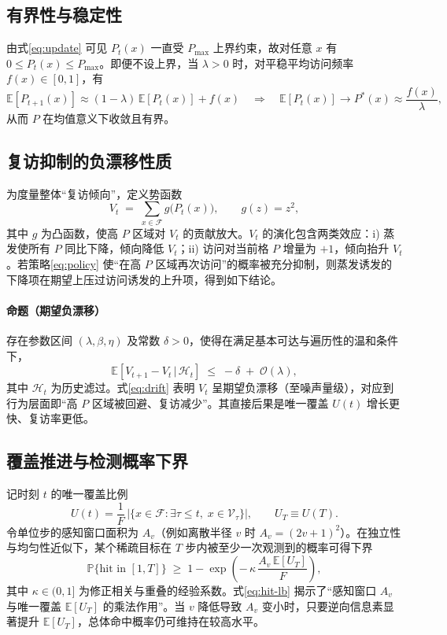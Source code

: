 \subsection{有界性与稳定性}
由式\eqref{eq:update} 可见 $P_{t}(x)$ 一直受 $P_{\max}$ 上界约束，故对任意 $x$ 有 $0\le P_t(x)\le P_{\max}$。即便不设上界，当 $\lambda>0$ 时，对平稳平均访问频率 $f(x)\in[0,1]$，有
\begin{equation}
\mathbb{E}[P_{t+1}(x)]\approx (1-\lambda)\,\mathbb{E}[P_t(x)]+f(x)
\quad\Rightarrow\quad
\mathbb{E}[P_t(x)]\to P^*(x)\approx \frac{f(x)}{\lambda},
\end{equation}
从而 $P$ 在均值意义下收敛且有界。

\subsection{复访抑制的负漂移性质}
为度量整体“复访倾向”，定义势函数
\begin{equation}
\label{eq:potential}
V_t \;=\; \sum_{x\in\mathcal{F}} g\big(P_t(x)\big),\qquad g(z)=z^2,
\end{equation}
其中 $g$ 为凸函数，使高 $P$ 区域对 $V_t$ 的贡献放大。$V_t$ 的演化包含两类效应：i) 蒸发使所有 $P$ 同比下降，倾向降低 $V_t$；ii) 访问对当前格 $P$ 增量为 $+1$，倾向抬升 $V_t$。若策略\eqref{eq:policy} 使“在高 $P$ 区域再次访问”的概率被充分抑制，则蒸发诱发的下降项在期望上压过访问诱发的上升项，得到如下结论。

\paragraph{命题（期望负漂移）}
存在参数区间 $(\lambda,\beta,\eta)$ 及常数 $\delta>0$，使得在满足基本可达与遍历性的温和条件下，
\begin{equation}
\label{eq:drift}
\mathbb{E}\!\left[V_{t+1}-V_t\,\big|\,\mathcal{H}_t\right]\;\le\; -\delta \;+\; \mathcal{O}(\lambda),
\end{equation}
其中 $\mathcal{H}_t$ 为历史滤过。式\eqref{eq:drift} 表明 $V_t$ 呈期望负漂移（至噪声量级），对应到行为层面即“高 $P$ 区域被回避、复访减少”。其直接后果是唯一覆盖 $U(t)$ 增长更快、复访率更低。

\subsection{覆盖推进与检测概率下界}
记时刻 $t$ 的唯一覆盖比例
\begin{equation}
U(t)=\frac{1}{F}\,\big|\{x\in\mathcal{F}:\exists \tau\le t,\; x\in \mathcal{V}_\tau\}\big|,
\qquad U_T\equiv U(T).
\end{equation}
令单位步的感知窗口面积为 $A_v$（例如离散半径 $v$ 时 $A_v=(2v+1)^2$）。在独立性与均匀性近似下，某个稀疏目标在 $T$ 步内被至少一次观测到的概率可得下界
\begin{equation}
\label{eq:hit-lb}
\mathbb{P}\{\text{hit in }[1,T]\}\;\ge\; 1-\exp\!\left(-\,\kappa\,\frac{A_v\,\mathbb{E}[U_T]}{F}\right),
\end{equation}
其中 $\kappa\in(0,1]$ 为修正相关与重叠的经验系数。式\eqref{eq:hit-lb} 揭示了“感知窗口 $A_v$ 与唯一覆盖 $\mathbb{E}[U_T]$ 的乘法作用”。当 $v$ 降低导致 $A_v$ 变小时，只要逆向信息素显著提升 $\mathbb{E}[U_T]$，总体命中概率仍可维持在较高水平。

